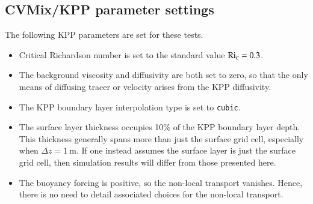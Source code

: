 \begin{table*}[h!t]
\caption{
  Surface boundary heat flux formulations for the three test cases.  
  The third test considers a restoring boundary condition
  for the top model grid cell, with restoring temperature given by  
  $\theta_{\mbox{\footnotesize restore}} 
  = \theta_s + 10^{\circ}C$, and the piston velocity set to 
  $w_{\mbox{\footnotesize piston}} = 0.5~\mbox{m}~\mbox{day}^{-1}$.}
\label{table:kpp-test-case-WSwPSBF}
\end{table*}


\subsection{CVMix/KPP parameter settings}

The following KPP parameters are set for these tests. 
\begin{itemize}

\item Critical Richardson number is set to the standard value $\mbox{Ri}_{\mbox{\footnotesize c}} = 0.3$.

\item The background viscosity and diffusivity are both set to zero,
  so that the only means of diffusing tracer or velocity arises from
  the KPP diffusivity.

\item The KPP boundary layer interpolation type is set to {\tt cubic}.

\item The surface layer thickness occupies 10\% of the KPP boundary
  layer depth.  This thickness generally spans more than just the
  surface grid cell, especially when $\Delta z = 1~\mbox{m}$.  If one
  instead assumes the surface layer is just the surface grid cell,
  then simulation results will differ from those presented here.

\item The buoyancy forcing is positive, so the non-local transport
  vanishes.  Hence, there is no need to detail associated choices for
  the non-local transport.

\end{itemize}


